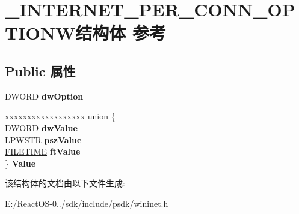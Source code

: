 \hypertarget{struct___i_n_t_e_r_n_e_t___p_e_r___c_o_n_n___o_p_t_i_o_n_w}{}\section{\+\_\+\+I\+N\+T\+E\+R\+N\+E\+T\+\_\+\+P\+E\+R\+\_\+\+C\+O\+N\+N\+\_\+\+O\+P\+T\+I\+O\+N\+W结构体 参考}
\label{struct___i_n_t_e_r_n_e_t___p_e_r___c_o_n_n___o_p_t_i_o_n_w}
\subsection*{Public 属性}
\begin{DoxyCompactItemize}
\item 
\mbox{\label{struct___i_n_t_e_r_n_e_t___p_e_r___c_o_n_n___o_p_t_i_o_n_w_aa84a0fdaaefa01fb89a1cd406883e1bd}} 
D\+W\+O\+RD {\bfseries dw\+Option}
\item 
\mbox{\label{struct___i_n_t_e_r_n_e_t___p_e_r___c_o_n_n___o_p_t_i_o_n_w_a3188a6095add836fb4adda1f23d2e878}} 
\begin{tabbing}
xx\=xx\=xx\=xx\=xx\=xx\=xx\=xx\=xx\=\kill
union \{\\
\>DWORD {\bfseries dwValue}\\
\>LPWSTR {\bfseries pszValue}\\
\>\hyperlink{struct___f_i_l_e_t_i_m_e}{FILETIME} {\bfseries ftValue}\\
\} {\bfseries Value}\\

\end{tabbing}\end{DoxyCompactItemize}


该结构体的文档由以下文件生成\+:\begin{DoxyCompactItemize}
\item 
E\+:/\+React\+O\+S-\/0../sdk/include/psdk/wininet.\+h\end{DoxyCompactItemize}

